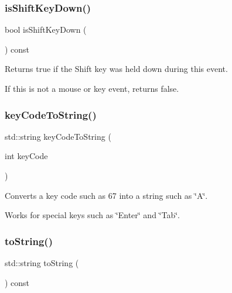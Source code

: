 \subsubsection{\texorpdfstring{is\+Shift\+Key\+Down()}{isShiftKeyDown()}}
{\footnotesize\ttfamily bool is\+Shift\+Key\+Down (\begin{DoxyParamCaption}{ }\end{DoxyParamCaption}) const\hspace{0.3cm}{\ttfamily [virtual]}}



Returns {\ttfamily true} if the Shift key was held down during this event. 

If this is not a mouse or key event, returns false. \mbox{\label{classsgl_1_1GEvent_a6e882459d29785fb753a3bf23f29cbc3}} 
\subsubsection{\texorpdfstring{key\+Code\+To\+String()}{keyCodeToString()}}
{\footnotesize\ttfamily std\+::string key\+Code\+To\+String (\begin{DoxyParamCaption}\item[{int}]{key\+Code }\end{DoxyParamCaption})\hspace{0.3cm}{\ttfamily [static]}}



Converts a key code such as 67 into a string such as \char`\"{}\+A\char`\"{}. 

Works for special keys such as \char`\"{}\+Enter\char`\"{} and \char`\"{}\+Tab\char`\"{}. \mbox{\label{classsgl_1_1GEvent_a1fe5121d6528fdea3f243321b3fa3a49}} 
\subsubsection{\texorpdfstring{to\+String()}{toString()}}
{\footnotesize\ttfamily std\+::string to\+String (\begin{DoxyParamCaption}{ }\end{DoxyParamCaption}) const\hspace{0.3cm}{\ttfamily [virtual]}}



